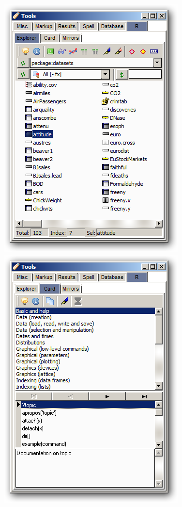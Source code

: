 \begin{figure}[h!]
  \includegraphics[scale=0.35]{./res/tools_r_explorer.png}~~
  \includegraphics[scale=0.35]{./res/tools_r_card.png}~~

\end{figure}
